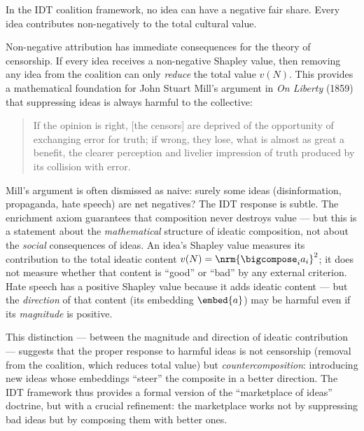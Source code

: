 \begin{corollary}
\label{cor:no-burden}
In the IDT coalition framework, no idea can have a negative fair share.  Every
idea contributes non-negatively to the total cultural value.
\end{corollary}

\begin{interpretation}
\label{interp:ch21:censorship_mill}
Non-negative attribution has immediate consequences for the theory of
censorship.  If every idea receives a non-negative Shapley value, then
removing any idea from the coalition can only \emph{reduce} the total
value $v(N)$.  This provides a mathematical foundation for John Stuart
Mill's argument in \textit{On Liberty} (1859) that suppressing ideas is
always harmful to the collective:

\begin{quote}
If the opinion is right, [the censors] are deprived of the opportunity
of exchanging error for truth; if wrong, they lose, what is almost as
great a benefit, the clearer perception and livelier impression of truth
produced by its collision with error.
\end{quote}

Mill's argument is often dismissed as naive: surely some ideas
(disinformation, propaganda, hate speech) are net negatives?  The IDT
response is subtle.  The enrichment axiom guarantees that composition
never destroys value --- but this is a statement about the
\emph{mathematical} structure of ideatic composition, not about the
\emph{social} consequences of ideas.  An idea's Shapley value measures
its contribution to the total ideatic content $v(N) = \nrm{\bigcompose_{i}
a_i}^2$; it does not measure whether that content is ``good'' or ``bad''
by any external criterion.  Hate speech has a positive Shapley value
because it adds ideatic content --- but the \emph{direction} of that
content (its embedding $\embed{a}$) may be harmful even if its
\emph{magnitude} is positive.

This distinction --- between the magnitude and direction of ideatic
contribution --- suggests that the proper response to harmful ideas is
not censorship (removal from the coalition, which reduces total value)
but \emph{countercomposition}: introducing new ideas whose embeddings
``steer'' the composite in a better direction.  The IDT framework thus
provides a formal version of the ``marketplace of ideas'' doctrine, but
with a crucial refinement: the marketplace works not by suppressing bad
ideas but by composing them with better ones.
\end{interpretation}

